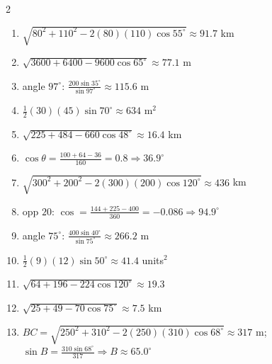\documentclass[11pt]{article}
\begin{document}
\begin{keybox}
\begin{multicols}{2}
\small
\begin{enumerate}[leftmargin=*,itemsep=3pt]
  \item $\sqrt{80^2+110^2-2(80)(110)\cos55^\circ}\approx91.7$ km
  \item $\sqrt{3600+6400-9600\cos65^\circ}\approx77.1$ m
  \item angle $97^\circ$: $\tfrac{200\sin35^\circ}{\sin97^\circ}\approx115.6$ m
  \item $\tfrac12(30)(45)\sin70^\circ\approx634$ m$^2$
  \item $\sqrt{225+484-660\cos48^\circ}\approx16.4$ km
  \item $\cos\theta=\tfrac{100+64-36}{160}=0.8\Rightarrow36.9^\circ$
  \item $\sqrt{300^2+200^2-2(300)(200)\cos120^\circ}\approx436$ km
  \item opp $20$: $\cos=\tfrac{144+225-400}{360}=-0.086\Rightarrow94.9^\circ$
  \item angle $75^\circ$: $\tfrac{400\sin40^\circ}{\sin75^\circ}\approx266.2$ m
  \item $\tfrac12(9)(12)\sin50^\circ\approx41.4$ units$^2$
  \item $\sqrt{64+196-224\cos120^\circ}\approx19.3$
  \item $\sqrt{25+49-70\cos75^\circ}\approx7.5$ km
  \item $BC=\sqrt{250^2+310^2-2(250)(310)\cos68^\circ}\approx317$ m; $\sin B=\tfrac{310\sin68^\circ}{317}\Rightarrow B\approx65.0^\circ$
\end{enumerate}
\end{multicols}
\end{keybox}
\end{document}
